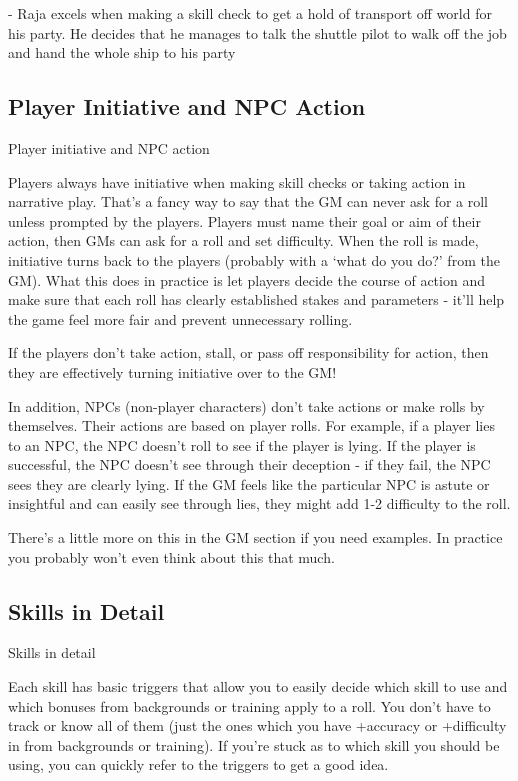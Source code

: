          - Raja excels when making a skill check to get a hold of transport off world for his party.
         He decides that he manages to talk the shuttle pilot to walk off the job and hand the
         whole ship to his party

\subsection{Player Initiative and NPC Action}
                                 Player initiative and NPC action


Players always have initiative when making skill checks or taking action in narrative play. That’s
a fancy way to say that the GM can never ask for a roll unless prompted by the players. Players
must name their goal or aim of their action, then GMs can ask for a roll and set difficulty. When
the roll is made, initiative turns back to the players (probably with a ‘what do you do?’ from the
GM). What this does in practice is let players decide the course of action and make sure that
each roll has clearly established stakes and parameters - it’ll help the game feel more fair and
prevent unnecessary rolling.


If the players don’t take action, stall, or pass off responsibility for action, then they are
effectively turning initiative over to the GM!


In addition, NPCs (non-player characters) don’t take actions or make rolls by themselves. Their
actions are based on player rolls. For example, if a player lies to an NPC, the NPC doesn’t roll to
see if the player is lying. If the player is successful, the NPC doesn’t see through their deception
- if they fail, the NPC sees they are clearly lying. If the GM feels like the particular NPC is astute
or insightful and can easily see through lies, they might add 1-2 difficulty to the roll.


There’s a little more on this in the GM section if you need examples. In practice you probably
won’t even think about this that much.

\subsection{Skills in Detail}
                                               Skills in detail


Each skill has basic triggers that allow you to easily decide which skill to use and which
bonuses from backgrounds or training apply to a roll. You don’t have to track or know all of
them (just the ones which you have +accuracy or +difficulty in from backgrounds or training). If
you’re stuck as to which skill you should be using, you can quickly refer to the triggers to get a
good idea.


